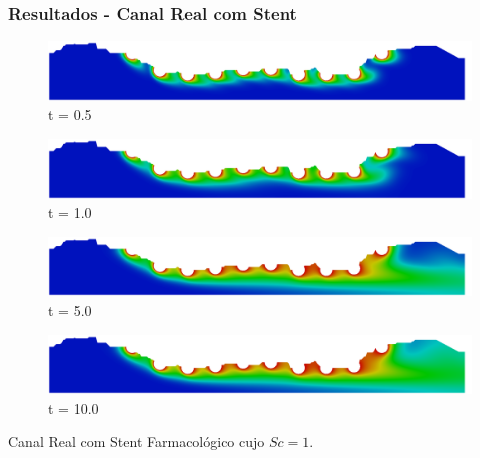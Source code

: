 \begin{frame}
 \frametitle{\Large Resultados - Canal Real com Stent}
\begin{figure}
     \begin{minipage}{.50\linewidth}
      \centering
      \includegraphics[scale=0.08]{images/conc1_RealStrut1000.png}\\
      \scriptsize t = 0.5
     \end{minipage}%
     \begin{minipage}{.50\linewidth}
      \centering
      \includegraphics[scale=0.08]{images/conc1_RealStrut2000.png}\\
      \scriptsize t = 1.0
     \end{minipage}
     \begin{minipage}{.50\linewidth}
     \medskip
      \centering
      \includegraphics[scale=0.08]{images/conc1_RealStrut10000.png}\\
      \scriptsize t = 5.0
     \end{minipage}%
     \begin{minipage}{.50\linewidth}
     \medskip
      \centering
      \includegraphics[scale=0.08]{images/conc1_RealStrut20000.png}\\
      \scriptsize t = 10.0
     \end{minipage}
\end{figure}
\vspace{0cm}
\centering \scriptsize Canal Real com Stent Farmacológico cujo $Sc=1$.
\vspace{0.5cm}
\begin{figure}
     \begin{minipage}{.50\linewidth}

\end{minipage}
\end{figure}
\end{frame}
